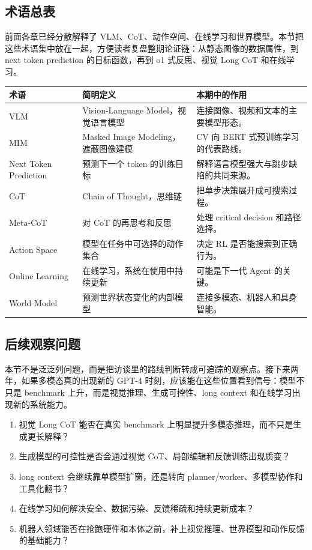 \documentclass[a4paper]{article}
\begin{document}
\subsection{术语总表}

前面各章已经分散解释了 VLM、CoT、动作空间、在线学习和世界模型。本节把这些术语集中放在一起，方便读者复盘整期论证链：从静态图像的数据属性，到 next token prediction 的目标函数，再到 o1 式反思、视觉 Long CoT 和在线学习。

\noindent\begin{tabularx}{\textwidth}{p{}p{}X}
\toprule
术语 & 简明定义 & 本期中的作用 \\
\midrule
VLM & Vision-Language Model，视觉语言模型 & 连接图像、视频和文本的主要模型形态。 \\
MIM & Masked Image Modeling，遮蔽图像建模 & CV 向 BERT 式预训练学习的代表路线。 \\
Next Token Prediction & 预测下一个 token 的训练目标 & 解释语言模型强大与跳步缺陷的共同来源。 \\
CoT & Chain of Thought，思维链 & 把单步决策展开成可搜索过程。 \\
Meta-CoT & 对 CoT 的再思考和反思 & 处理 critical decision 和路径选择。 \\
Action Space & 模型在任务中可选择的动作集合 & 决定 RL 是否能搜索到正确行为。 \\
Online Learning & 在线学习，系统在使用中持续更新 & 可能是下一代 Agent 的关键。 \\
World Model & 预测世界状态变化的内部模型 & 连接多模态、机器人和具身智能。 \\
\bottomrule
\end{tabularx}

\subsection{后续观察问题}

本节不是泛泛列问题，而是把访谈里的路线判断转成可追踪的观察点。接下来两年，如果多模态真的出现新的 GPT-4 时刻，应该能在这些位置看到信号：模型不只是 benchmark 上升，而是视觉推理、生成可控性、long context 和在线学习出现新的系统能力。

\begin{enumerate}
\item 视觉 Long CoT 能否在真实 benchmark 上明显提升多模态推理，而不只是生成更长解释？
\item 生成模型的可控性是否会通过视觉 CoT、局部编辑和反馈训练出现质变？
\item long context 会继续靠单模型扩窗，还是转向 planner/worker、多模型协作和工具化翻书？
\item 在线学习如何解决安全、数据污染、反馈稀疏和持续更新成本？
\item 机器人领域能否在抢跑硬件和本体之前，补上视觉推理、世界模型和动作反馈的基础能力？
\end{enumerate}
\end{document}
